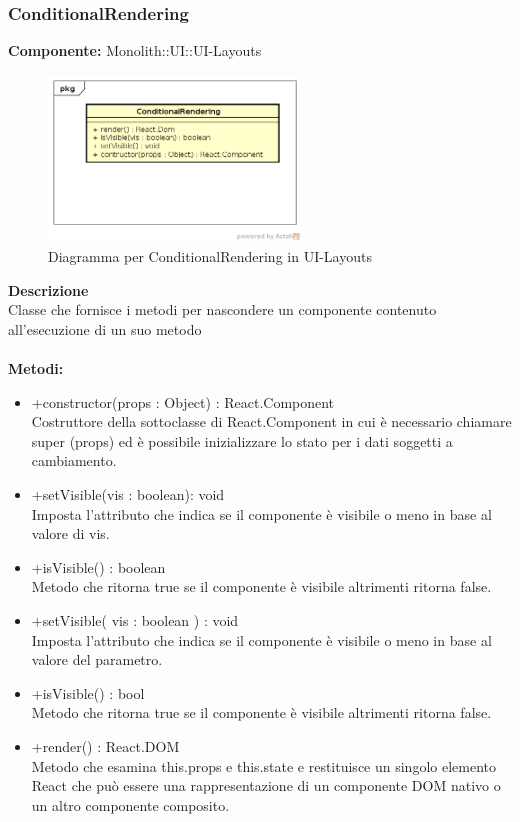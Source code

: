 \subsubsection{ConditionalRendering}
\textbf{Componente:}  Monolith::UI::UI-Layouts\\
   \FloatBarrier
   \begin{figure}[ht]
   \centering
   \includegraphics[width=0.6\textwidth]{img/single-ConditionalRendering}
   \caption{{Diagramma per ConditionalRendering in UI-Layouts}}
\end{figure}
\FloatBarrier
\textbf{Descrizione}\\
Classe che fornisce i metodi per nascondere un componente contenuto all'esecuzione di un suo metodo \\\\
\textbf{Metodi:} \\
\begin{itemize}\item +constructor(props : Object) : React.Component \\Costruttore della sottoclasse di React.Component in cui è necessario chiamare super (props) ed è possibile inizializzare lo stato per i dati soggetti a cambiamento.\item +setVisible(vis : boolean): void \\Imposta l'attributo che indica se il componente è visibile o meno in base al valore di vis.\item +isVisible() : boolean \\Metodo che ritorna true se il componente è visibile altrimenti ritorna false.\item +setVisible( vis : boolean ) : void \\Imposta l'attributo che indica se il componente è visibile o meno in base al valore del parametro.\item +isVisible() : bool \\Metodo che ritorna true se il componente è visibile altrimenti ritorna false.\item +render() : React.DOM \\Metodo che esamina this.props e this.state e restituisce un singolo elemento React che può essere una rappresentazione di un componente DOM nativo o un altro componente composito.\end{itemize} 


